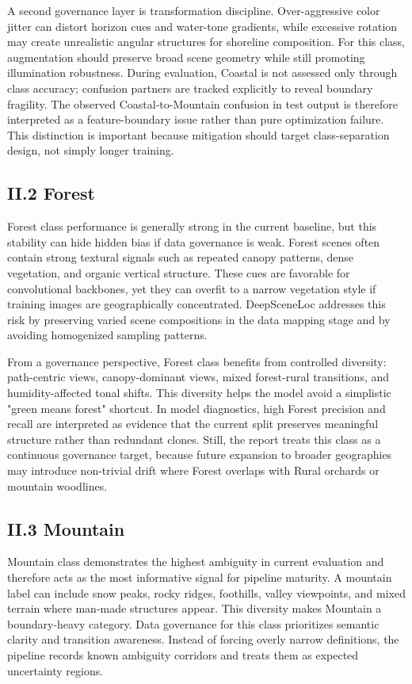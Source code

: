 A second governance layer is transformation discipline. Over-aggressive color jitter can distort horizon cues and water-tone gradients, while excessive rotation may create unrealistic angular structures for shoreline composition. For this class, augmentation should preserve broad scene geometry while still promoting illumination robustness. During evaluation, Coastal is not assessed only through class accuracy; confusion partners are tracked explicitly to reveal boundary fragility. The observed Coastal-to-Mountain confusion in test output is therefore interpreted as a feature-boundary issue rather than pure optimization failure. This distinction is important because mitigation should target class-separation design, not simply longer training.

\subsection*{II.2 Forest}
Forest class performance is generally strong in the current baseline, but this stability can hide hidden bias if data governance is weak. Forest scenes often contain strong textural signals such as repeated canopy patterns, dense vegetation, and organic vertical structure. These cues are favorable for convolutional backbones, yet they can overfit to a narrow vegetation style if training images are geographically concentrated. DeepSceneLoc addresses this risk by preserving varied scene compositions in the data mapping stage and by avoiding homogenized sampling patterns.

From a governance perspective, Forest class benefits from controlled diversity: path-centric views, canopy-dominant views, mixed forest-rural transitions, and humidity-affected tonal shifts. This diversity helps the model avoid a simplistic "green means forest" shortcut. In model diagnostics, high Forest precision and recall are interpreted as evidence that the current split preserves meaningful structure rather than redundant clones. Still, the report treats this class as a continuous governance target, because future expansion to broader geographies may introduce non-trivial drift where Forest overlaps with Rural orchards or mountain woodlines.

\subsection*{II.3 Mountain}
Mountain class demonstrates the highest ambiguity in current evaluation and therefore acts as the most informative signal for pipeline maturity. A mountain label can include snow peaks, rocky ridges, foothills, valley viewpoints, and mixed terrain where man-made structures appear. This diversity makes Mountain a boundary-heavy category. Data governance for this class prioritizes semantic clarity and transition awareness. Instead of forcing overly narrow definitions, the pipeline records known ambiguity corridors and treats them as expected uncertainty regions.

